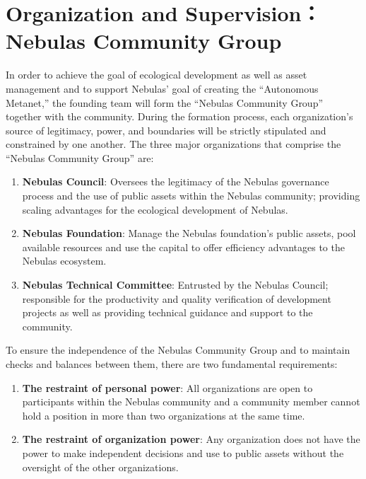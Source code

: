\section{Organization and Supervision：Nebulas Community Group}

In order to achieve the goal of ecological development as well as asset management and to support Nebulas’ goal of creating the “Autonomous Metanet,” the founding team will form the “Nebulas Community Group” together with the community. During the formation process, each organization’s source of legitimacy, power, and boundaries will be strictly stipulated and constrained by one another. The three major organizations that comprise the “Nebulas Community Group” are:

\begin{enumerate}
	\item \textbf{Nebulas Council}: Oversees the legitimacy of the Nebulas governance process and the use of public assets within the Nebulas community; providing scaling advantages for the ecological development of Nebulas.
	\item \textbf{Nebulas Foundation}: Manage the Nebulas foundation’s public assets, pool available resources and use the capital to offer efficiency advantages to the Nebulas ecosystem.
	\item \textbf{Nebulas Technical Committee}: Entrusted by the Nebulas Council; responsible for the productivity and quality verification of development projects as well as providing technical guidance and support to the community.
\end{enumerate}

\vspace{2em}

To ensure the independence of the Nebulas Community Group and to maintain checks and balances between them, there are two fundamental requirements:

\begin{enumerate}
	\item \textbf{The restraint of personal power}: All organizations are open to participants within the Nebulas community and a community member cannot hold a position in more than two organizations at the same time.
	\item \textbf{The restraint of organization power}: Any organization does not have the power to make independent decisions and use to public assets without the oversight of the other organizations.
\end{enumerate}

